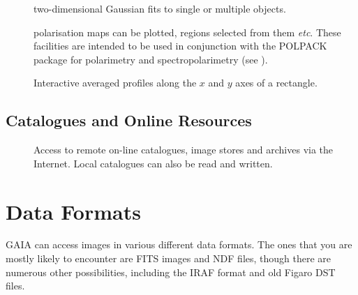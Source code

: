 \documentclass[twoside,11pt]{starlink}
\begin{document}
\begin{description}
  \item[]
   two-dimensional Gaussian fits to single or multiple objects.

  \item[]
   polarisation maps can be plotted, regions selected from them \emph{etc}.
   These facilities are intended to be used in conjunction with the
   POLPACK package for polarimetry and spectropolarimetry (see
   \cite{SUN223}).

  \item[]
   Interactive averaged profiles along the $x$\/ and $y$\/ axes of a
   rectangle.

\end{description}

\subsection{Catalogues and Online Resources}

\begin{description}

  \item[]
   Access to remote on-line catalogues, image stores and archives via the
   Internet. Local catalogues can also be read and written.

\end{description}


\section{\label{FORMATS}Data Formats}

GAIA can access images in various different data formats.  The ones that
you are mostly likely to encounter are FITS images and NDF files, though
there are numerous other possibilities, including the IRAF format and
old Figaro DST files.
\end{document}
